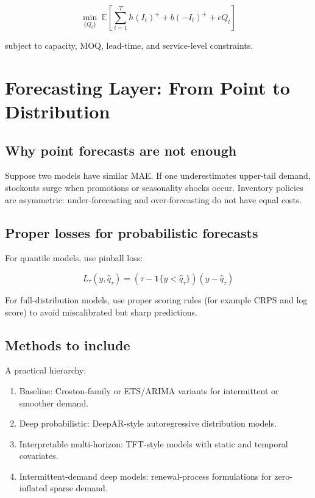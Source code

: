 \documentclass[11pt,a4paper]{article}
\begin{document}
\begin{equation}
\min_{\{Q_t\}} \; \mathbb{E}\left[\sum_{t=1}^{T} h(I_t)^+ + b(-I_t)^+ + cQ_t\right]
\label{eq:multi_period_cost}
\end{equation}

subject to capacity, MOQ, lead-time, and service-level constraints.

\section{Forecasting Layer: From Point to Distribution}

\subsection{Why point forecasts are not enough}

Suppose two models have similar MAE. If one underestimates upper-tail demand, stockouts surge when promotions or seasonality shocks occur. Inventory policies are asymmetric: under-forecasting and over-forecasting do not have equal costs.

\subsection{Proper losses for probabilistic forecasts}

For quantile models, use pinball loss:

\begin{equation}
L_{\tau}(y, \hat{q}_{\tau}) = (\tau - \mathbf{1}\{y < \hat{q}_{\tau}\})(y - \hat{q}_{\tau})
\label{eq:pinball}
\end{equation}

For full-distribution models, use proper scoring rules (for example CRPS and log score) to avoid miscalibrated but sharp predictions.

\subsection{Methods to include}

A practical hierarchy:

\begin{enumerate}
    \item Baseline: Croston-family or ETS/ARIMA variants for intermittent or smoother demand.
    \item Deep probabilistic: DeepAR-style autoregressive distribution models.
    \item Interpretable multi-horizon: TFT-style models with static and temporal covariates.
    \item Intermittent-demand deep models: renewal-process formulations for zero-inflated sparse demand.
\end{enumerate}
\end{document}
